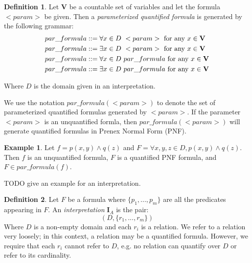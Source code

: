 \documentclass[12pt]{article}
\theoremstyle{definition}
\newtheorem{definition}{Definition}
\newtheorem{example}{Example}
\theoremstyle{remark}
\newcommand{\msp}{\text{ }}
\begin{document}
\begin{definition}
  Let $\mathbf{V}$ be a countable set of variables and let the formula $<param>$ be given.  Then a \textit{parameterized quantified formula} is generated by the following grammar:
  \begin{align*}
    par\_formula &::= \forall x \in D \msp <param> \hfill \text{ for any } x \in \mathbf{V}\\
    par\_formula &::= \exists x \in D \msp <param> \hfill \text{ for any } x \in \mathbf{V}\\
    par\_formula &::= \forall x \in D \msp par\_formula \hfill \text{ for any } x \in \mathbf{V}\\
    par\_formula &::= \exists x \in D \msp par\_formula \hfill \text{ for any } x \in \mathbf{V}\\
  \end{align*}

  Where $D$ is the domain given in an interpretation.

  We use the notation $par\_formula(<param>)$ to denote the set of parameterized quantified formulas generated by $<param>$.  If the parameter $<param>$ is an unquantified formla, then $par\_formula(<param>)$ will generate quantified formulas in Prenex Normal Form (PNF).

\end{definition}

\begin{example}
  Let $f = p(x,y) \land q(z)$ and $F = \forall x,y,z \in D, p(x,y) \land q(z)$.  Then $f$ is an unquantified formula, $F$ is a quantified PNF formula, and $F \in par\_formula(f)$.

  TODO give an example for an interpretation.
\end{example}

\begin{definition}
  Let $F$ be a formula where $\{p_1,...,p_m\}$ are all the predicates appearing in $F$.  An \textit{interpretation} $\mathbf{I}_A$ is the pair:
  $$(D, \{r_1,...,r_m\})$$
  Where $D$ is a non-empty domain and each $r_i$ is a relation.  We refer to a relation very loosely; in this context, a relation may be a quantified formula.  However, we require that each $r_i$ cannot refer to $D$, e.g. no relation can quantify over $D$ or refer to its cardinality.
\end{definition}
\end{document}
